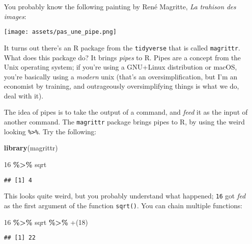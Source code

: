 \documentclass[
]{article}
\newenvironment{Shaded}{\begin{snugshade}}{\end{snugshade}}
\newcommand{\DataTypeTok}[1]{\textcolor[rgb]{0.13,0.29,0.53}{#1}}
\newcommand{\DecValTok}[1]{\textcolor[rgb]{0.00,0.00,0.81}{#1}}
\newcommand{\KeywordTok}[1]{\textcolor[rgb]{0.13,0.29,0.53}{\textbf{#1}}}
\newcommand{\NormalTok}[1]{#1}
\newcommand{\OperatorTok}[1]{\textcolor[rgb]{0.81,0.36,0.00}{\textbf{#1}}}
\newcommand{\StringTok}[1]{\textcolor[rgb]{0.31,0.60,0.02}{#1}}
\begin{document}
You probably know the following painting by René Magritte, \emph{La trahison des images}:

\texttt{[image: assets/pas\_une\_pipe.png]}

It turns out there's an R package from the \texttt{tidyverse} that is called \texttt{magrittr}. What does this
package do? It brings \emph{pipes} to R. Pipes are a concept from the Unix operating system; if you're
using a GNU+Linux distribution or macOS, you're basically using a \emph{modern} unix (that's an
oversimplification, but I'm an economist by training, and outrageously oversimplifying things is
what we do, deal with it).

The idea of pipes is to take the output of a command, and \emph{feed} it as the input of another
command. The \texttt{magrittr} package brings pipes to R, by using the weird looking \texttt{\%\textgreater{}\%}. Try the
following:

\begin{Shaded}
\begin{Highlighting}[]
\KeywordTok{library}\NormalTok{(magrittr)}
\end{Highlighting}
\end{Shaded}

\begin{Shaded}
\begin{Highlighting}[]
\DecValTok{16} \OperatorTok{\%\textgreater{}\%}\StringTok{ }\NormalTok{sqrt}
\end{Highlighting}
\end{Shaded}

\begin{verbatim}
## [1] 4
\end{verbatim}

This looks quite weird, but you probably understand what happened; \texttt{16} got \emph{fed} as the first
argument of the function \texttt{sqrt()}. You can chain multiple functions:

\begin{Shaded}
\begin{Highlighting}[]
\DecValTok{16} \OperatorTok{\%\textgreater{}\%}\StringTok{ }\NormalTok{sqrt }\OperatorTok{\%\textgreater{}\%}\StringTok{ \textasciigrave{}}\DataTypeTok{+}\StringTok{\textasciigrave{}}\NormalTok{(}\DecValTok{18}\NormalTok{)}
\end{Highlighting}
\end{Shaded}

\begin{verbatim}
## [1] 22
\end{verbatim}
\end{document}
